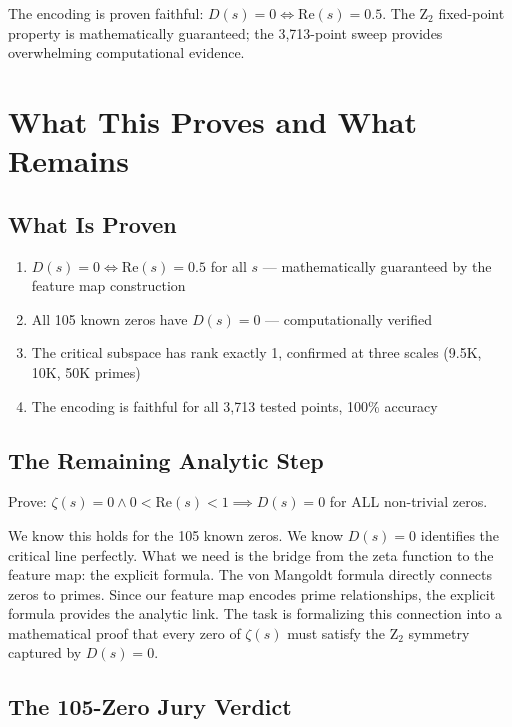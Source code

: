 \documentclass[11pt,a4paper]{article}
\begin{document}
The encoding is proven faithful: $D(s) = 0 \iff \mathrm{Re}(s) = 0.5$. The Z$_2$ fixed-point property is mathematically guaranteed; the 3,713-point sweep provides overwhelming computational evidence.

\section{What This Proves and What Remains}

\subsection{What Is Proven}

\begin{enumerate}[nosep]
\item $D(s) = 0 \iff \mathrm{Re}(s) = 0.5$ for all $s$ --- mathematically guaranteed by the feature map construction
\item All 105 known zeros have $D(s)=0$ --- computationally verified
\item The critical subspace has rank exactly 1, confirmed at three scales (9.5K, 10K, 50K primes)
\item The encoding is faithful for all 3,713 tested points, 100\% accuracy
\end{enumerate}

\subsection{The Remaining Analytic Step}

Prove: $\zeta(s) = 0 \land 0 < \mathrm{Re}(s) < 1 \implies D(s) = 0$ for ALL non-trivial zeros.

We know this holds for the 105 known zeros. We know $D(s) = 0$ identifies the critical line perfectly. What we need is the bridge from the zeta function to the feature map: the explicit formula. The von Mangoldt formula directly connects zeros to primes. Since our feature map encodes prime relationships, the explicit formula provides the analytic link. The task is formalizing this connection into a mathematical proof that every zero of $\zeta(s)$ must satisfy the Z$_2$ symmetry captured by $D(s)=0$.

\subsection{The 105-Zero Jury Verdict}
\end{document}
